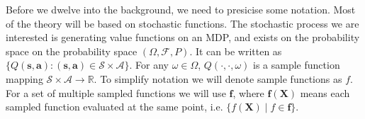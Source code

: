 \documentclass[]{uai2021} %
\newcommand{\defeq}{\vcentcolon=}
\newcommand{\E}{\mathbb{E}}
\newcommand{\D}{\mathcal{D}}
\newcommand{\B}{\mathcal{B}}
\newcommand{\X}{\mathbf{X}}
\newcommand{\f}{\mathbf{f}}
\newcommand{\state}{\mathcal{S}}
\newcommand{\action}{\mathcal{A}}
\begin{document}
Before we dwelve into the background, we need to presicise some notation. Most of the
theory will be based on stochastic functions. The stochastic process we are interested is
generating value functions on an MDP, and exists on the probability space on the probability
space \((\Omega, \mathcal{F}, P)\). It can be written as
\(\{Q(\bm{s}, \bm{a}) : (\bm{s}, \bm{a}) \in \state \times \action \}\). For
any \(\omega \in \Omega\), \(Q(\cdot, \cdot, \omega)\) is a sample function
mapping \(\state \times \action \rightarrow \mathbb{R}\). To simplify notation
we will denote sample functions as \(f\). For a set of multiple sampled functions we will
use \(\f\), where \(\f(\X)\) means each sampled function evaluated at the same point,
i.e. \(\{f(\X) \mid f \in \f\}\).


\end{document}
